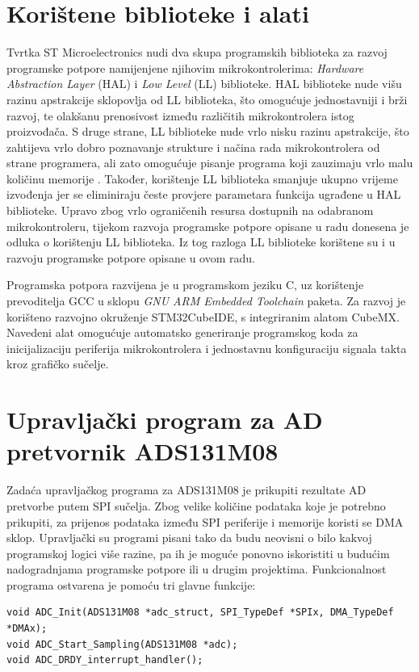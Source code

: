 \section{Korištene biblioteke i alati}
Tvrtka ST Microelectronics nudi dva skupa programskih biblioteka za razvoj programske potpore namijenjene njihovim mikrokontrolerima: \textit{Hardware Abstraction Layer} (HAL) i \textit{Low Level} (LL) biblioteke. HAL biblioteke nude višu razinu apstrakcije sklopovlja od LL biblioteka, što omogućuje jednostavniji i brži razvoj, te olakšanu prenosivost između različitih mikrokontrolera istog proizvođača. S druge strane, LL biblioteke nude vrlo nisku razinu apstrakcije, što zahtijeva vrlo dobro poznavanje strukture i načina rada mikrokontrolera od strane programera, ali zato omogućuje pisanje programa koji zauzimaju vrlo malu količinu memorije \cite{stm_hal_ll}. Također, korištenje LL biblioteka smanjuje ukupno vrijeme izvođenja jer se eliminiraju česte provjere parametara funkcija ugrađene u HAL biblioteke. Upravo zbog vrlo ograničenih resursa dostupnih na odabranom mikrokontroleru, tijekom razvoja programske potpore opisane u radu \cite{diplomski_goran_petrak} donesena je odluka o korištenju LL biblioteka. Iz tog razloga LL biblioteke korištene su i u razvoju programske potpore opisane u ovom radu.

Programska potpora razvijena je u programskom jeziku C, uz korištenje prevoditelja GCC u sklopu \textit{GNU ARM Embedded Toolchain} paketa. Za razvoj je korišteno razvojno okruženje STM32CubeIDE, s integriranim alatom CubeMX. Navedeni alat omogućuje automatsko generiranje programskog koda za inicijalizaciju periferija mikrokontrolera i jednostavnu konfiguraciju signala takta kroz grafičko sučelje.

\section{Upravljački program za AD pretvornik ADS131M08}

Zadaća upravljačkog programa za ADS131M08 je prikupiti rezultate AD pretvorbe putem SPI sučelja. Zbog velike količine podataka koje je potrebno prikupiti, za prijenos podataka između SPI periferije i memorije koristi se DMA sklop. Upravljački su programi pisani tako da budu neovisni o bilo kakvoj programskoj logici više razine, pa ih je moguće ponovno iskoristiti u budućim nadogradnjama programske potpore ili u drugim projektima. Funkcionalnost programa ostvarena je pomoću tri glavne funkcije:

\begin{lstlisting}
void ADC_Init(ADS131M08 *adc_struct, SPI_TypeDef *SPIx, DMA_TypeDef *DMAx);
void ADC_Start_Sampling(ADS131M08 *adc);
void ADC_DRDY_interrupt_handler();
\end{lstlisting}

